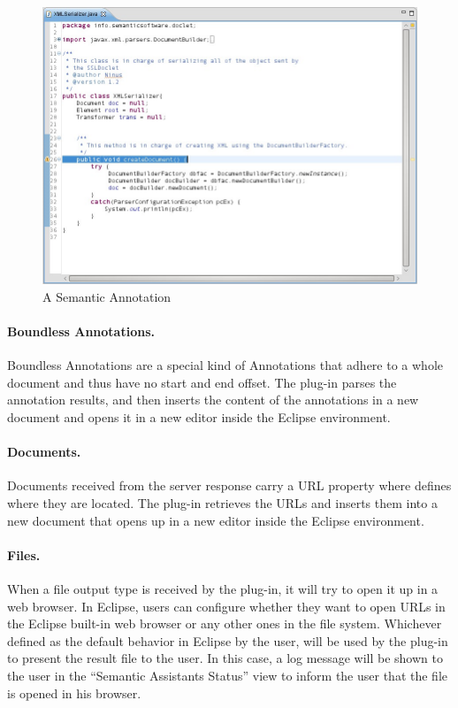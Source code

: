 \begin{figure}[htb]
\begin{center}
  \includegraphics[width=1\textwidth]{pictures/eclipse_annotation.jpg}
  \caption{A Semantic Annotation}
  \label{fig:eclipse_annotation}
\end{center}
\end{figure}

\paragraph{Boundless Annotations.}
Boundless Annotations are a special kind of Annotations that adhere to a whole document and thus have no start and end offset. The plug-in parses the annotation results, and then inserts the content of the annotations in a new document and opens it in a new editor inside the Eclipse environment.

\paragraph{Documents.}
Documents received from the server response carry a URL property where defines where they are located. The plug-in retrieves the URLs and inserts them into a new document that opens up in a new editor inside the Eclipse environment.

\paragraph{Files.}
When a file output type is received by the plug-in, it will try to open it up in a web browser. In Eclipse, users can configure whether they want to open URLs in the Eclipse built-in web browser or any other ones in the file system. Whichever defined as the default behavior in Eclipse by the user, will be used by the plug-in to present the result file to the user. In this case, a log message will be shown to the user in the ``Semantic Assistants Status'' view to inform the user that the file is opened in his browser.

